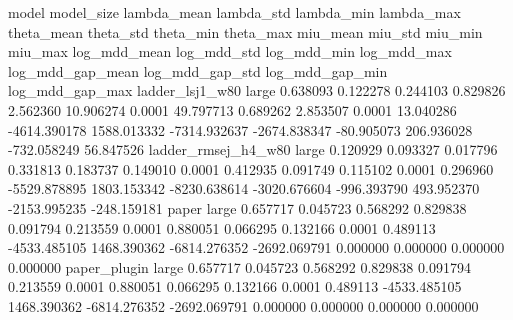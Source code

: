               model model_size  lambda_mean  lambda_std  lambda_min  lambda_max  theta_mean  theta_std  theta_min  theta_max  miu_mean  miu_std  miu_min   miu_max  log_mdd_mean  log_mdd_std  log_mdd_min  log_mdd_max  log_mdd_gap_mean  log_mdd_gap_std  log_mdd_gap_min  log_mdd_gap_max
    ladder_lsj1_w80      large     0.638093    0.122278    0.244103    0.829826    2.562360  10.906274     0.0001  49.797713  0.689262 2.853507   0.0001 13.040286  -4614.390178  1588.013332 -7314.932637 -2674.838347        -80.905073       206.936028      -732.058249        56.847526
ladder_rmsej_h4_w80      large     0.120929    0.093327    0.017796    0.331813    0.183737   0.149010     0.0001   0.412935  0.091749 0.115102   0.0001  0.296960  -5529.878895  1803.153342 -8230.638614 -3020.676604       -996.393790       493.952370     -2153.995235      -248.159181
              paper      large     0.657717    0.045723    0.568292    0.829838    0.091794   0.213559     0.0001   0.880051  0.066295 0.132166   0.0001  0.489113  -4533.485105  1468.390362 -6814.276352 -2692.069791          0.000000         0.000000         0.000000         0.000000
       paper_plugin      large     0.657717    0.045723    0.568292    0.829838    0.091794   0.213559     0.0001   0.880051  0.066295 0.132166   0.0001  0.489113  -4533.485105  1468.390362 -6814.276352 -2692.069791          0.000000         0.000000         0.000000         0.000000